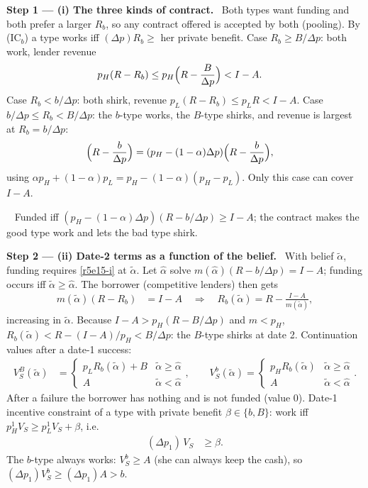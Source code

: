 \documentclass[11pt,a4paper]{article}
\newcommand{\step}[2]{\par\medskip\noindent\textbf{Step #1 --- #2.}~}
\newcommand{\answer}[1]{\par\smallskip\noindent\fbox{\textbf{Answer #1.}}~}
\begin{document}
\step{1}{(i) The three kinds of contract} Both types want funding and both prefer a larger $R_b$, so any contract offered is accepted by both (pooling). By (IC$_b$) a type works iff $(\Delta p)R_b\ge$ her private benefit. Case $R_b\ge B/\Delta p$: both work, lender revenue
\begin{align}
  p_H(R-R_b) &\le p_H\Bigl(R-\frac{B}{\Delta p}\Bigr) < I-A. \nonumber
\end{align}
Case $R_b<b/\Delta p$: both shirk, revenue $p_L(R-R_b)\le p_LR<I-A$. Case $b/\Delta p\le R_b<B/\Delta p$: the $b$-type works, the $B$-type shirks, and revenue is largest at $R_b=b/\Delta p$:
\begin{align}
  [\alpha p_H+(1-\alpha)p_L]\Bigl(R-\frac{b}{\Delta p}\Bigr) &= (p_H-(1-\alpha)\Delta p)\Bigl(R-\frac{b}{\Delta p}\Bigr), \label{r5e15-i}
\end{align}
using $\alpha p_H+(1-\alpha)p_L = p_H-(1-\alpha)(p_H-p_L)$. Only this case can cover $I-A$.
\answer{(i)} Funded iff $(p_H-(1-\alpha)\Delta p)(R-b/\Delta p)\ge I-A$; the contract makes the good type work and lets the bad type shirk.

\step{2}{(ii) Date-2 terms as a function of the belief} With belief $\tilde\alpha$, funding requires \eqref{r5e15-i} at $\tilde\alpha$. Let $\hat\alpha$ solve $m(\hat\alpha)(R-b/\Delta p)=I-A$; funding occurs iff $\tilde\alpha\ge\hat\alpha$. The borrower (competitive lenders) then gets
\begin{align}
  m(\tilde\alpha)(R-R_b) &= I-A \quad\Longrightarrow\quad R_b(\tilde\alpha) = R - \frac{I-A}{m(\tilde\alpha)}, \label{r5e15-Rb}
\end{align}
increasing in $\tilde\alpha$. Because $I-A>p_H(R-B/\Delta p)$ and $m<p_H$, $R_b(\tilde\alpha)<R-(I-A)/p_H<B/\Delta p$: the $B$-type shirks at date 2. Continuation values after a date-1 success:
\begin{align}
  V^B_S(\tilde\alpha) &= \begin{cases} p_LR_b(\tilde\alpha)+B & \tilde\alpha\ge\hat\alpha \\ A & \tilde\alpha<\hat\alpha\end{cases},\qquad
  V^b_S(\tilde\alpha) = \begin{cases} p_HR_b(\tilde\alpha) & \tilde\alpha\ge\hat\alpha \\ A & \tilde\alpha<\hat\alpha\end{cases}. \nonumber
\end{align}
After a failure the borrower has nothing and is not funded (value 0). Date-1 incentive constraint of a type with private benefit $\beta\in\{b,B\}$: work iff $p^1_HV_S \ge p^1_LV_S+\beta$, i.e.
\begin{align}
  (\Delta p_1)\,V_S &\ge \beta. \label{r5e15-IC1}
\end{align}
The $b$-type always works: $V^b_S\ge A$ (she can always keep the cash), so $(\Delta p_1)V^b_S\ge(\Delta p_1)A>b$.
\end{document}
